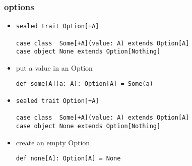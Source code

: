 \documentclass[include/preamble.tex]{subfiles}
\begin{document}
\begin{frame}[fragile]
  \frametitle{options}
  \pause
  \begin{center}
    \begin{itemize}
    \item[]
      \begin{lstlisting}[style=scala]
sealed trait Option[+A]

case class  Some[+A](value: A) extends Option[A]
case object None extends Option[Nothing]
      \end{lstlisting}
      \vspace{1em}
      \pause
    \item
      put a value in an Option
      \newline
      \newline
      \pause
      \pause
      \vspace{1em}
      \begin{lstlisting}[style=scala]
def some[A](a: A): Option[A] = Some(a)
      \end{lstlisting}
    \end{itemize}
  \end{center}
\end{frame}

\begin{frame}[fragile]
  \begin{center}
    \begin{itemize}
    \item[]
      \begin{lstlisting}[style=scala]
sealed trait Option[+A]

case class  Some[+A](value: A) extends Option[A]
case object None extends Option[Nothing]
      \end{lstlisting}
      \vspace{1em}
      \pause
    \item
      create an empty Option
      \newline
      \pause
      \begin{lstlisting}[style=scala]
def none[A]: Option[A] = None
      \end{lstlisting}
      \pause
      \vspace{1em}
    \end{itemize}
  \end{center}
\end{frame}
\end{document}
